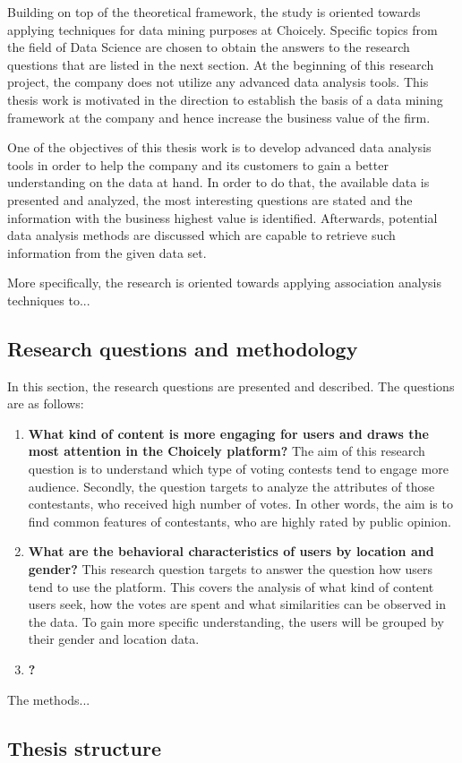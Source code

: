     Building on top of the theoretical framework, the study is oriented towards applying techniques for data mining purposes at Choicely. Specific topics from the field of Data Science are chosen to obtain the answers to the research questions that are listed in the next section. At the beginning of this research project, the company does not utilize any advanced data analysis tools. This thesis work is motivated in the direction to establish the basis of a data mining framework at the company and hence increase the business value of the firm.  

    One of the objectives of this thesis work is to develop advanced data analysis tools in order to help the company and its customers to gain a better understanding on the data at hand. In order to do that, the available data is presented and analyzed, the most interesting questions are stated and the information with the business highest value is identified. Afterwards, potential data analysis methods are discussed which are capable to retrieve such information from the given data set.  

    More specifically, the research is oriented towards applying association analysis techniques to... %

\subsection{Research questions and methodology}
    In this section, the research questions are presented and described. The questions are as follows:

    \begin{enumerate}[label=RQ\arabic*:]
        \item \textbf{What kind of content is more engaging for users and draws the most attention in the Choicely platform?} The aim of this research question is to understand which type of voting contests tend to engage more audience. Secondly, the question targets to analyze the attributes of those contestants, who received high number of votes. In other words, the aim is to find common features of contestants, who are highly rated by public opinion.     
        \item \textbf{What are the behavioral characteristics of users by location and gender?} This research question targets to answer the question how users tend to use the platform. This covers the analysis of what kind of content users seek, how the votes are spent and what similarities can be observed in the data. To gain more specific understanding, the users will be grouped by their gender and location data.  
        \item \textbf{?}
    \end{enumerate}  

    The methods...

\subsection{Thesis structure}

